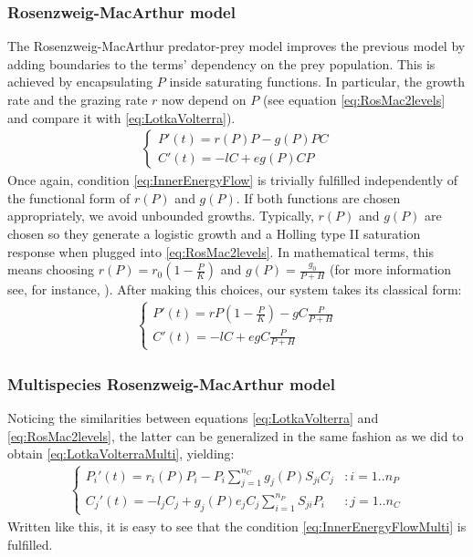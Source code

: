 \subsubsection{Rosenzweig-MacArthur model}
\label{subsubsec:Rosenzweig-MacArthur}
The Rosenzweig-MacArthur predator-prey model improves the previous model by adding boundaries to the terms' dependency on the prey population. This is achieved by encapsulating $P$ inside saturating functions. In particular, the growth rate and the grazing rate $r$ now depend on $P$ (see equation \eqref{eq:RosMac2levels} and compare it with \eqref{eq:LotkaVolterra}).
%
\begin{eqnarray}
\label{eq:RosMac2levels}
	\begin{cases}
	P'(t) = r(P) P - g(P) P C
	\\
	C'(t) = - l C + e g(P) C P
	\end{cases}
\end{eqnarray}
%
Once again, condition \eqref{eq:InnerEnergyFlow} is trivially fulfilled independently of the functional form of $r(P)$ and $g(P)$. If both functions are chosen appropriately, we avoid unbounded growths. Typically, $r(P)$ and $g(P)$ are chosen so they generate a logistic growth and a Holling type II saturation response when plugged into \eqref{eq:RosMac2levels}. In mathematical terms, this means choosing $r(P) = r_0 \left(1 - \frac{P}{K} \right)$ and $g(P) = \frac{g_0}{P+H}$ (for more information see, for instance, \citet{Edelstein-Keshet}). After making this choices, our system takes its classical form:
%
\begin{eqnarray}
\label{eq:RosMac2classic}
	\begin{cases}
	P'(t) =  r P \left( 1 - \frac{P}{K} \right) - g C \frac{P}{P + H}
	\\
	C'(t) = - l C + e g C \frac{P}{P + H}
	\end{cases}
\end{eqnarray}
%

\subsubsection{Multispecies Rosenzweig-MacArthur model}
\label{subsubsec:Rosenzweig-MacArthurMulti}

Noticing the similarities between equations \eqref{eq:LotkaVolterra} and \eqref{eq:RosMac2levels}, the latter can be generalized in the same fashion as we did to obtain \eqref{eq:LotkaVolterraMulti}, yielding:
%
\begin{eqnarray}
\label{eq:RosMacMulti}
	\begin{cases}
	P_i'(t) = r_i(P) P_i - P_i \sum_{j = 1}^{n_C} g_j(P) S_{ji} C_j & : i = 1..n_P
	\\
	C_j'(t) = - l_j C_j +  g_j(P) e_j C_j \sum_{i = 1}^{n_P} S_{ji} P_i  & : j = 1..n_C
	\end{cases}
\end{eqnarray}
%
Written like this, it is easy to see that the condition \eqref{eq:InnerEnergyFlowMulti} is fulfilled.


